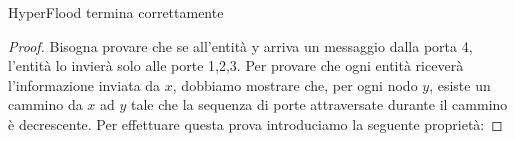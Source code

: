 \begin{prop}
    HyperFlood termina correttamente
\end{prop}
\begin{proof}
    Bisogna provare che se all'entità y arriva un messaggio dalla porta 4,
    l'entità lo invierà solo alle porte 1,2,3. Per provare che ogni entità
    riceverà l'informazione inviata da $x$, dobbiamo mostrare che, per ogni nodo
    $y$, esiste un cammino da $x$ ad $y$ tale che la sequenza di porte
    attraversate durante il cammino è decrescente. Per effettuare questa prova
    introduciamo la seguente proprietà:
\end{proof}

